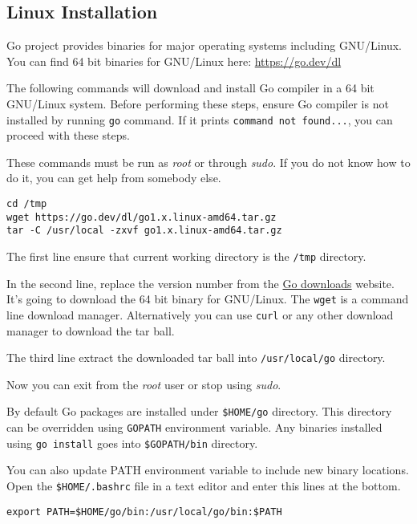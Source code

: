 \subsection{Linux Installation}

Go project provides binaries for major operating systems including GNU/Linux.
You can find 64 bit binaries for GNU/Linux here: \url{https://go.dev/dl}

The following commands will download and install Go
compiler in a 64 bit GNU/Linux system. Before performing these steps, ensure Go
compiler is not installed by running \texttt{go} command. If it
prints \texttt{command not found...}, you can proceed with these steps.

These commands must be run as \textit{root} or through \textit{sudo}. If you do
not know how to do it, you can get help from somebody else.

\begin{lstlisting}[numbers=none]
cd /tmp
wget https://go.dev/dl/go1.x.linux-amd64.tar.gz
tar -C /usr/local -zxvf go1.x.linux-amd64.tar.gz
\end{lstlisting}

The first line ensure that current working directory is the \texttt{/tmp}
directory.

In the second line, replace the version number from
the \href{https://go.dev/dl}{Go downloads} website. It's going to download the
64 bit binary for GNU/Linux. The \texttt{wget} is a command line download
manager. Alternatively you can use \texttt{curl} or any other download manager
to download the tar ball.

The third line extract the downloaded tar ball into \texttt{/usr/local/go}
directory.

Now you can exit from the \textit{root} user or stop using \textit{sudo}.

By default Go packages are installed under \texttt{\$HOME/go} directory. This
directory can be overridden using \texttt{GOPATH} environment variable. Any
binaries installed using \texttt{go install} goes into \texttt{\$GOPATH/bin}
directory.

You can also update PATH environment variable to include new binary locations.
Open the \texttt{\$HOME/.bashrc} file in a text editor and enter this lines at
the bottom.

\begin{lstlisting}[numbers=none]
export PATH=$HOME/go/bin:/usr/local/go/bin:$PATH
\end{lstlisting}

